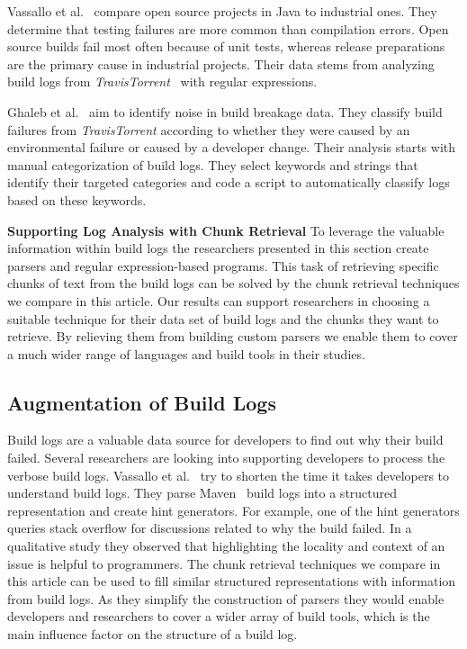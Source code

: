 Vassallo et al.~\cite{vassallo2017a-tale} compare open source projects in Java to industrial ones.
They determine that testing failures are more common than compilation errors.
Open source builds fail most often because of unit tests, whereas release preparations are the primary cause in industrial projects.
Their data stems from analyzing build logs from \emph{TravisTorrent}~\cite{beller2017travistorrent} with regular expressions.

Ghaleb et al.~\cite{ghaleb2019studying} aim to identify noise in build breakage data.
They classify build failures from \emph{TravisTorrent} according to whether they were caused by an environmental failure or caused by a developer change.
Their analysis starts with manual categorization of build logs.
They select keywords and strings that identify their targeted categories and code a script to automatically classify logs based on these keywords.

\noindent
\textbf{Supporting Log Analysis with Chunk Retrieval}
To leverage the valuable information within build logs the researchers presented
in this section create parsers and regular expression-based programs.
This task of retrieving specific chunks of text from the build logs can be
solved by the chunk retrieval techniques we compare in this article.
Our results can support researchers in choosing a suitable technique for their
data set of build logs and the chunks they want to retrieve.
By relieving them from building custom parsers we enable them to cover a much
wider range of languages and build tools in their studies.


\subsection{Augmentation of Build Logs}
\label{sec:rw-bl-analysis}
Build logs are a valuable data source for developers to find out why their build failed.
Several researchers are looking into supporting developers to process the verbose build logs.
Vassallo et al.~\cite{vassallo2018un-break} try to shorten the time it takes developers to understand build logs.
They parse Maven~\cite{maven2019website} build logs into a structured representation and create hint generators.
For example, one of the hint generators queries stack overflow for discussions related to why the build failed.
In a qualitative study they observed that highlighting the locality and context of an issue is helpful to programmers.
The chunk retrieval techniques we compare in this article can be used to fill similar structured representations with information from build logs.
As they simplify the construction of parsers they would enable developers and researchers to cover a wider array of build tools, which is the main influence factor on the structure of a build log.

